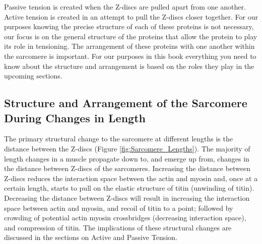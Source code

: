 Passive tension is created when the Z-discs are pulled apart from one another. Active tension is created in an attempt to pull the Z-discs closer together. For our purposes knowing the precise structure of each of these proteins is not necessary,\footnotemark{} our focus is on the general structure of the proteins that allow the protein to play its role in tensioning. The arrangement of these proteins with one another within the sarcomere is important. For our purposes in this book everything you need to know about the structure and arrangement is based on the roles they play in the upcoming sections.

\subsection{Structure and Arrangement of the Sarcomere During Changes in Length}

The primary structural change to the sarcomere at different lengths is the distance between the Z-discs (Figure \ref{fig:Sarcomere_Lengths}). The majority of length changes in a muscle propagate down to, and emerge up from, changes in the distance between Z-discs of the sarcomeres.\footnotemark{} Increasing the distance between Z-discs reduces the interaction space between the actin and myosin and, once at a certain length, starts to pull on the elastic structure of titin (unwinding of titin). Decreasing the distance between Z-discs will result in increasing the interaction space between actin and myosin, and recoil of titin to a point; followed by crowding of potential actin myosin crossbridges (decreasing interaction space), and compression of titin. The implications of these structural changes are discussed in the sections on Active and Passive Tension.

